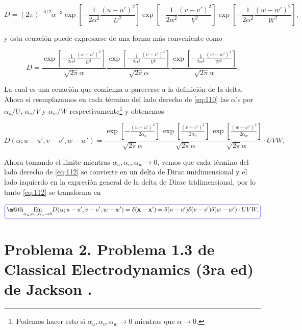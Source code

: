 \documentclass[a4paper,11pt]{article}
\makeatletter
\numberwithin{equation}{section}
\newcommand*{\boxcolor}{blue}
\renewcommand{\boxed}[1]{\textcolor{\boxcolor}{%
\tikz[baseline={([yshift=-1ex]current bounding box.center)}] \node [rectangle, minimum width=1ex,rounded corners,draw] {\normalcolor\m@th$\displaystyle#1$};}}
\makeatother
\begin{document}
\begin{equation*}
 D = (2\pi)^{-3/2}\alpha^{-3}
 \exp\left[-\frac{1}{2\alpha^2}\frac{(u - u')^2}{U^2}\right]
 \exp\left[-\frac{1}{2\alpha^2}\frac{(v-v')^2}{V^2}\right]
 \exp\left[-\frac{1}{2\alpha^2}\frac{(w-w')^2}{W^2}\right],
\end{equation*}

y esta ecuación puede expresarse de una forma más conveniente como 

\begin{equation}
 D = \frac{\exp\left[-\frac{1}{2\alpha^2}\frac{(u - u')^2}{U^2}\right]}{\sqrt{2\pi}\alpha}
 \frac{\exp\left[-\frac{1}{2\alpha^2}\frac{(v-v')^2}{V^2}\right]}{\sqrt{2\pi}\alpha}
 \frac{\exp\left[-\frac{1}{2\alpha^2}\frac{(w-w')^2}{W^2}\right]}{\sqrt{2\pi}\alpha}.
\label{eq:110}
\end{equation}

La cual es una ecuación que comienza a parecerse a la definición de la delta. Ahora 
si reemplazamos en cada término del lado derecho de \eqref{eq:110} las $\alpha$'s 
por $\alpha_u/U$, $\alpha_v/V$ y $\alpha_w/W$ respectivamente\footnote{Podemos 
hacer esto si $\alpha_u,\alpha_v,\alpha_w \rightarrow 0$ mientras que 
$\alpha \rightarrow 0$.} y obtenemos 

\begin{equation}
 D(\alpha;u-u',v-v',w-w') = \frac{\exp\left[-\frac{(u - u')^2}{2\alpha_u}\right]}{\sqrt{2\pi}\alpha}
 \frac{\exp\left[\frac{(v-v')^2}{2\alpha_v}\right]}{\sqrt{2\pi}\alpha}
 \frac{\exp\left[\frac{(w-w')^2}{2\alpha_w}\right]}{\sqrt{2\pi}\alpha}\cdot UVW.
 \label{eq:112}
\end{equation}

Ahora tomando el límite mientras $\alpha_u,\alpha_v,\alpha_w \rightarrow 0$, 
vemos que cada término del lado derecho de \eqref{eq:112} se convierte en un 
delta de Dirac unidimensional y el lado izquierdo en la expresión 
general de la delta de Dirac tridimensional, por lo tanto \eqref{eq:112} se 
transforma en 

\begin{equation*}
 \boxed{\underset{\alpha_u,\alpha_v,\alpha_w \rightarrow 0}{\text{lím}} 
 D(\alpha;u-u',v-v',w-w') = \delta(\mathbf{x} - \mathbf{x}') = 
 \delta(u - u')\delta(v - v')\delta(w - w')\cdot UVW.}
\end{equation*}

\section{Problema 2. Problema 1.3 de Classical Electrodynamics (3ra ed) de 
Jackson \cite{jackson}.}
\end{document}
